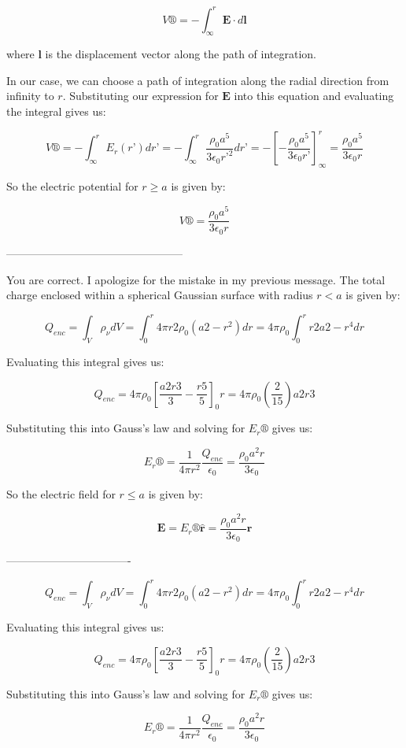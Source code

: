 $$ V® = -\int_\infty^r \mathbf{E} \cdot d\mathbf{l} $$

where $\mathbf{l}$ is the displacement vector along the path of integration.

In our case, we can choose a path of integration along the radial direction from infinity to $r$. Substituting our expression for $\mathbf{E}$ into this equation and evaluating the integral gives us:

$$ V® = -\int_\infty^r E_r(r’) dr’ = -\int_\infty^r \frac{\rho_0 a^5}{3\epsilon_0 r’^2} dr’ = -\left[-\frac{\rho_0 a^5}{3\epsilon_0 r’}\right]_\infty^r = \frac{\rho_0 a^5}{3\epsilon_0 r} $$

So the electric potential for $r \geq a$ is given by:

$$ V® = \frac{\rho_0 a^5}{3\epsilon_0 r} $$

------------------------------------------------


You are correct. I apologize for the mistake in my previous message. The total charge enclosed within a spherical Gaussian surface with radius $r<a$ is given by:

$$ Q_{enc} = \int_V \rho_\nu dV = \int_0^r 4\pi r2\rho_0\left(a2-r^2\right) dr = 4\pi\rho_0\int_0^r r2a2 - r^4 dr $$

Evaluating this integral gives us:

$$ Q_{enc} = 4\pi\rho_0\left[\frac{a2r3}{3}-\frac{r5}{5}\right]_0r = 4\pi\rho_0\left(\frac{2}{15}\right)a2r3 $$

Substituting this into Gauss’s law and solving for $E_r®$ gives us:

$$ E_r® = \frac{1}{4\pi r^2}\frac{Q_{enc}}{\epsilon_0} = \frac{\rho_0 a^2 r}{3 \epsilon_0} $$

So the electric field for $r \leq a$ is given by:

$$ \mathbf{E} = E_r®\hat{\mathbf{r}} = \frac{\rho_0 a^2 r}{3 \epsilon_0}\hat{\mathbf{r}} $$

----------------------------------


$$ Q_{enc} = \int_V \rho_\nu dV = \int_0^r 4\pi r2\rho_0\left(a2-r^2\right) dr = 4\pi\rho_0\int_0^r r2a2 - r^4 dr $$

Evaluating this integral gives us:

$$ Q_{enc} = 4\pi\rho_0\left[\frac{a2r3}{3}-\frac{r5}{5}\right]_0r = 4\pi\rho_0\left(\frac{2}{15}\right)a2r3 $$

Substituting this into Gauss’s law and solving for $E_r®$ gives us:

$$ E_r® = \frac{1}{4\pi r^2}\frac{Q_{enc}}{\epsilon_0} = \frac{\rho_0 a^2 r}{3 \epsilon_0} $$

